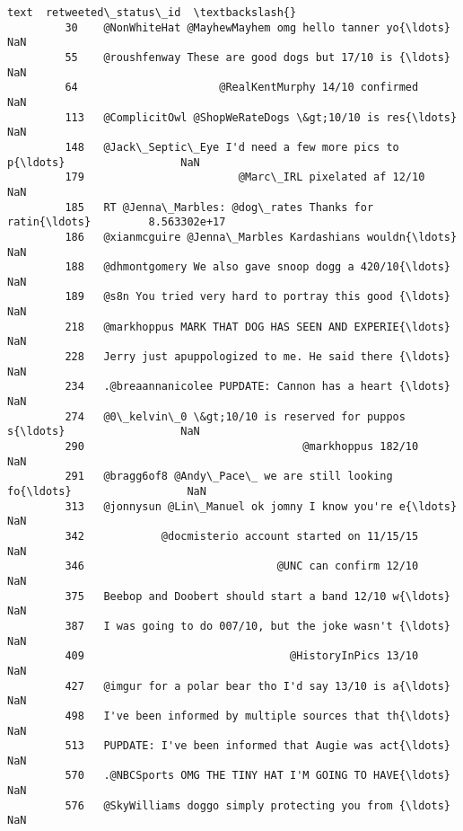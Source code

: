 \documentclass[11pt]{article}
\begin{document}
\begin{Verbatim}[commandchars=\\\{\}]
                                                            text  retweeted\_status\_id  \textbackslash{}
         30    @NonWhiteHat @MayhewMayhem omg hello tanner yo{\ldots}                  NaN   
         55    @roushfenway These are good dogs but 17/10 is {\ldots}                  NaN   
         64                      @RealKentMurphy 14/10 confirmed                  NaN   
         113   @ComplicitOwl @ShopWeRateDogs \&gt;10/10 is res{\ldots}                  NaN   
         148   @Jack\_Septic\_Eye I'd need a few more pics to p{\ldots}                  NaN   
         179                        @Marc\_IRL pixelated af 12/10                  NaN   
         185   RT @Jenna\_Marbles: @dog\_rates Thanks for ratin{\ldots}         8.563302e+17   
         186   @xianmcguire @Jenna\_Marbles Kardashians wouldn{\ldots}                  NaN   
         188   @dhmontgomery We also gave snoop dogg a 420/10{\ldots}                  NaN   
         189   @s8n You tried very hard to portray this good {\ldots}                  NaN   
         218   @markhoppus MARK THAT DOG HAS SEEN AND EXPERIE{\ldots}                  NaN   
         228   Jerry just apuppologized to me. He said there {\ldots}                  NaN   
         234   .@breaannanicolee PUPDATE: Cannon has a heart {\ldots}                  NaN   
         274   @0\_kelvin\_0 \&gt;10/10 is reserved for puppos s{\ldots}                  NaN   
         290                                  @markhoppus 182/10                  NaN   
         291   @bragg6of8 @Andy\_Pace\_ we are still looking fo{\ldots}                  NaN   
         313   @jonnysun @Lin\_Manuel ok jomny I know you're e{\ldots}                  NaN   
         342            @docmisterio account started on 11/15/15                  NaN   
         346                              @UNC can confirm 12/10                  NaN   
         375   Beebop and Doobert should start a band 12/10 w{\ldots}                  NaN   
         387   I was going to do 007/10, but the joke wasn't {\ldots}                  NaN   
         409                                @HistoryInPics 13/10                  NaN   
         427   @imgur for a polar bear tho I'd say 13/10 is a{\ldots}                  NaN   
         498   I've been informed by multiple sources that th{\ldots}                  NaN   
         513   PUPDATE: I've been informed that Augie was act{\ldots}                  NaN   
         570   .@NBCSports OMG THE TINY HAT I'M GOING TO HAVE{\ldots}                  NaN   
         576   @SkyWilliams doggo simply protecting you from {\ldots}                  NaN   

\end{Verbatim}
\end{document}
